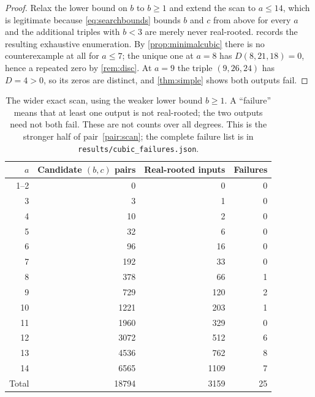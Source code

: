 \documentclass[11pt,letterpaper]{article}
\numberwithin{equation}{section}
\newtheorem{proposition}[theorem]{Proposition}
\theoremstyle{definition}
\theoremstyle{remark}
\begin{document}
\begin{proof}
Relax the lower bound on $b$ to $b\ge1$ and extend the scan to $a\le14$, which
is legitimate because \eqref{eq:searchbounds} bounds $b$ and $c$ from above
for every $a$ and the additional triples with $b<3$ are merely never
real-rooted.  records the resulting exhaustive
enumeration. By \cref{prop:minimalcubic} there is no counterexample at all for
$a\le7$; the unique one at $a=8$ has $D(8,21,18)=0$, hence a repeated zero by
\cref{rem:disc}. At $a=9$ the triple $(9,26,24)$ has $D=4>0$, so its zeros are
distinct, and \cref{thm:simple} shows both outputs fail.
\end{proof}

\begin{table}[htbp]
\centering
\begin{tabular}{@{}rrrr@{}}
\toprule
$a$ & Candidate $(b,c)$ pairs & Real-rooted inputs & Failures\\
\midrule
1--2 & 0 & 0 & 0\\
3 & 3 & 1 & 0\\
4 & 10 & 2 & 0\\
5 & 32 & 6 & 0\\
6 & 96 & 16 & 0\\
7 & 192 & 33 & 0\\
8 & 378 & 66 & 1\\
9 & 729 & 120 & 2\\
10 & 1221 & 203 & 1\\
11 & 1960 & 329 & 0\\
12 & 3072 & 512 & 6\\
13 & 4536 & 762 & 8\\
14 & 6565 & 1109 & 7\\
\midrule
Total & 18794 & 3159 & 25\\
\bottomrule
\end{tabular}
\caption{The wider exact scan, using the weaker lower bound $b\ge1$. A
``failure'' means that at least one output is not real-rooted; the two outputs
need not both fail. These are not counts over all degrees. This is the
stronger half of pair~\ref{pair:scan}; the complete failure list is in
\texttt{results/cubic\_failures.json}.}
\label{tab:cubiccounts}
\end{table}
\end{document}
